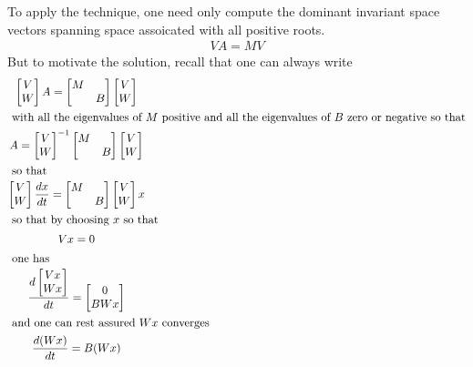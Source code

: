 \documentclass[1p]{elsarticle}
\begin{document}
To apply the technique, one need only 
compute the dominant invariant space vectors  spanning space assoicated with all
positive roots.
\begin{gather*}
  V A = M V
\end{gather*}
But to motivate the solution, recall that one can always write
\begin{gather*}
  \begin{bmatrix}
    V\\W
  \end{bmatrix} A = 
  \begin{bmatrix}
    M&\\&B
  \end{bmatrix}  \begin{bmatrix}
    V\\W
  \end{bmatrix}\\ \intertext{ with all the eigenvalues of $M$ positive and
all the eigenvalues of $B$ zero or negative so that}
 A   = 
\begin{bmatrix}
    V\\W
  \end{bmatrix}^{-1}  \begin{bmatrix}
    M&\\&B
  \end{bmatrix}   \begin{bmatrix}
    V\\W
  \end{bmatrix}\\ \intertext{ so that }
\begin{bmatrix}
    V\\W
  \end{bmatrix}\frac{dx}{dt} = \begin{bmatrix}
    M&\\&B
  \end{bmatrix} \begin{bmatrix}
    V\\W
  \end{bmatrix} x \\ \intertext{ so that by choosing $x$ so that}
V x = 0\\ \intertext{ one has }
\frac{d\begin{bmatrix}
    V x\\W x
  \end{bmatrix}
}{dt} = 
\begin{bmatrix}
  0\\B W x
\end{bmatrix}\\ \intertext{ and one can rest assured $Wx$ converges }
\frac{d (W x)}{dt} = 
 B(W x)
\end{gather*}
\end{document}
